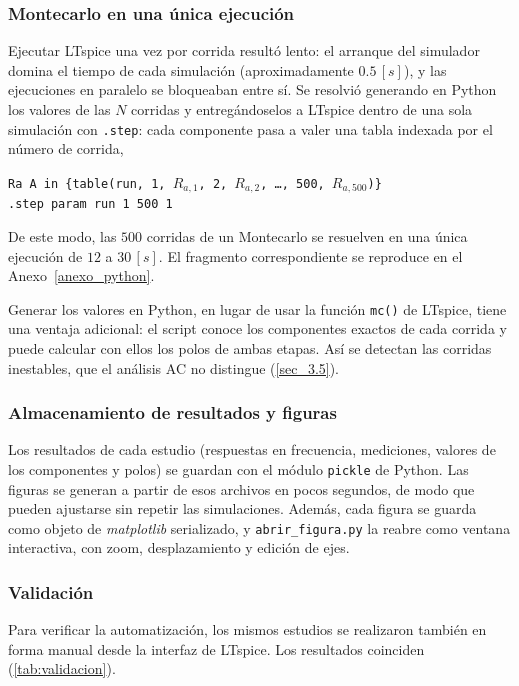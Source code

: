 \subsubsection{Montecarlo en una única ejecución}
Ejecutar LTspice una vez por corrida resultó lento: el arranque del simulador domina el tiempo de cada simulación (aproximadamente $0.5 \, [s]$), y las ejecuciones en paralelo se bloqueaban entre sí. Se resolvió generando en Python los valores de las $N$ corridas y entregándoselos a LTspice dentro de una sola simulación con \texttt{.step}: cada componente pasa a valer una tabla indexada por el número de corrida,
\begin{center}
    \texttt{Ra A in \{table(run, 1, }$R_{a,1}$\texttt{, 2, }$R_{a,2}$\texttt{, \ldots, 500, }$R_{a,500}$\texttt{)\}} \\
    \texttt{.step param run 1 500 1}
\end{center}
De este modo, las $500$ corridas de un Montecarlo se resuelven en una única ejecución de $12$ a $30 \, [s]$. El fragmento correspondiente se reproduce en el Anexo~\ref{anexo_python}.

Generar los valores en Python, en lugar de usar la función \texttt{mc()} de LTspice, tiene una ventaja adicional: el script conoce los componentes exactos de cada corrida y puede calcular con ellos los polos de ambas etapas. Así se detectan las corridas inestables, que el análisis AC no distingue (\autoref{sec_3.5}).

\subsubsection{Almacenamiento de resultados y figuras}
Los resultados de cada estudio (respuestas en frecuencia, mediciones, valores de los componentes y polos) se guardan con el módulo \texttt{pickle} de Python. Las figuras se generan a partir de esos archivos en pocos segundos, de modo que pueden ajustarse sin repetir las simulaciones. Además, cada figura se guarda como objeto de \textit{matplotlib} serializado, y \texttt{abrir\_figura.py} la reabre como ventana interactiva, con zoom, desplazamiento y edición de ejes.

\subsubsection{Validación}
Para verificar la automatización, los mismos estudios se realizaron también en forma manual desde la interfaz de LTspice. Los resultados coinciden (\autoref{tab:validacion}).

